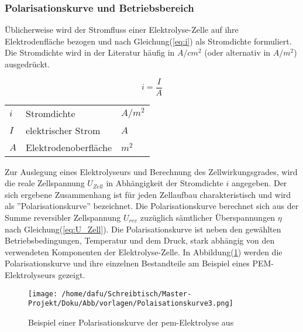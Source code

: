 \documentclass[onecolumn,10pt,titlepage]{article}
\begin{document}
			\subsubsection{Polarisationskurve und Betriebsbereich}
			Üblicherweise wird der Stromfluss einer Elektrolyse-Zelle auf ihre Elektrodenfläche bezogen und nach Gleichung(\ref{eq:i}) als Stromdichte formuliert.\cite{Hey.26.Oktober2012} Die Stromdichte wird in der Literatur häufig in $A/cm^2$ (oder alternativ in $A/m^2$) ausgedrückt.

			\begin{equation}
				i=\frac{I}{A}
				\label{eq:i}
			\end{equation}

			\begin{table}[H]
				\begin{tabular*}{\textwidth}{lll}\\
					$i$&Stromdichte&$A/m^2$\\
					$I$&elektrischer Strom&$A$\\
					$A$&Elektrodenoberfläche&$m^2$\\
				\end{tabular*}
			\end{table}

			Zur Auslegung eines Elektrolyseurs und Berechnung des Zellwirkungsgrades, wird die reale Zellspannung $U_{Zell}$ in Abhängigkeit der Stromdichte $i$ angegeben.\cite{Tjarks.2017} Der sich ergebene Zusammenhang ist für jeden Zellaufbau charakteristisch und wird als ''Polarisationskurve'' bezeichnet. Die Polarisationskurve berechnet sich aus der Summe reversibler Zellspannung $U_{rev}$ zuzüglich sämtlicher Überspannungen $\eta$ nach Gleichung(\ref{eq:U_Zell}). Die Polarisationskurve ist neben den gewählten Betriebsbedingungen, Temperatur und dem Druck, stark abhängig von den verwendeten Komponenten der Elektrolyse-Zelle. In Abbildung(\ref{fig:polar_Grundlagen}) werden die Polarisationskurve und ihre einzelnen Bestandteile am Beispiel eines PEM-Elektrolyseurs gezeigt.

			\begin{figure}[H]
				\centering

				\texttt{[image: /home/dafu/Schreibtisch/Master-Projekt/Doku/Abb/vorlagen/Polaisationskurve3.png]}
				\caption[Beispiel einer PEM-Polarisationskurve]{Beispiel einer Polarisationskurve der \gls{pem}-Elektrolyse aus \cite{Abdin.2017}}
				\label{fig:polar_Grundlagen}
			\end{figure}
\end{document}
